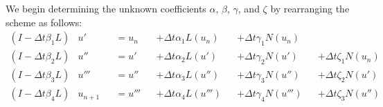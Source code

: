 \documentclass[letterpaper,11pt]{amsart}
\begin{document}
We begin determining the unknown coefficients $\alpha$, $\beta$, $\gamma$,
and $\zeta$ by rearranging the scheme as follows:
\begin{subequations}
\begin{alignat}{5}
  \left( I - \Delta{}t \beta_{1} L \right) &u'
  &&= u_{n}
  &&+ \Delta{}t \alpha_{1} L(u_{n})
  &&+ \Delta{}t \gamma_{1} N(u_{n})
\\
  \left( I - \Delta{}t \beta_{2} L \right) &u''
  &&= u'
  &&+ \Delta{}t \alpha_{2} L(u')
  &&+ \Delta{}t \gamma_{2} N(u')
  &&+ \Delta{}t \zeta_{1}  N(u_{n})
\\
  \left( I - \Delta{}t \beta_{3} L \right) &u'''
  &&= u''
  &&+ \Delta{}t \alpha_{3} L(u'')
  &&+ \Delta{}t \gamma_{3} N(u'')
  &&+ \Delta{}t \zeta_{2}  N(u')
\\
  \left( I - \Delta{}t \beta_{4} L \right) &u_{n+1}
  &&= u'''
  &&+ \Delta{}t \alpha_{4} L(u''')
  &&+ \Delta{}t \gamma_{4} N(u''')
  &&+ \Delta{}t \zeta_{3}  N(u'')
\end{alignat}
\end{subequations}
\end{document}

